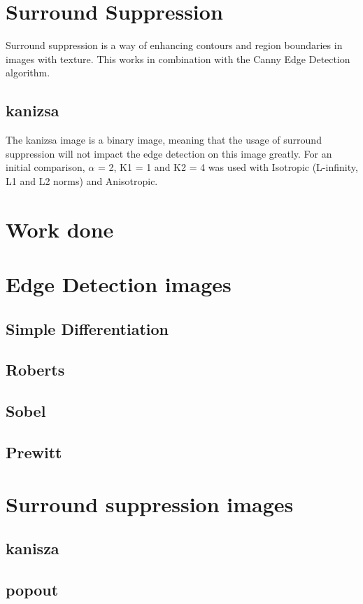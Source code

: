 \documentclass[10pt,a4paper]{article}
\begin{document}
\section{Surround Suppression}
Surround suppression is a way of enhancing contours and region boundaries in images with texture. This works in combination with the Canny Edge Detection algorithm.

\subsection{kanizsa}
The kanizsa image is a binary image, meaning that the usage of surround suppression will not impact the edge detection on this image greatly.
For an initial comparison, $\alpha$ = 2, K1 = 1 and K2 = 4 was used with Isotropic (L-infinity, L1 and L2 norms) and Anisotropic.

\section{Work done}

\section{Edge Detection images}
\subsection{Simple Differentiation}


\subsection{Roberts}


\subsection{Sobel}


\subsection{Prewitt}


\section{Surround suppression images}
\subsection{kanisza}




\subsection{popout}


\end{document}
